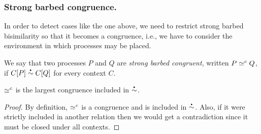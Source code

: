 




\subsubsection{Strong barbed congruence.}
In order to detect cases like the one above, we need to restrict strong barbed bisimilarity so that it becomes a congruence,
i.e., %
we have to consider the environment in which processes may be placed.

We say that two processes \( P \) and \( Q \) are \emph{strong barbed congruent}, written \( P \simeq^c Q \), if \( \sbbisim{\applyctx{C}{P}}{\applyctx{C}{Q}} \) for every context \( C \).

\begin{lemma}
  \( \simeq^c \) is the largest congruence included in
  \( \sbbisim{}{} \).
\end{lemma}
\begin{proof}
  By definition, \( \simeq^c \) is a congruence and is included in
  \( \sbbisim{}{} \). Also, if it were strictly included in another
  relation then we would get a contradiction since it must be closed
  under all contexts.
\end{proof}

